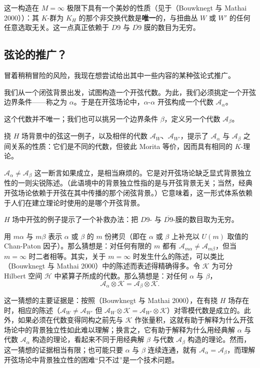 这一构造在 \(M=\infty\) 极限下具有一个美妙的性质（见于（Bouwknegt 与 Mathai 2000））：其 \(K\)-群为 \(K_H\) 的那个非交换代数是\textbf{唯一}的，与扭曲丛 \(W\) 或 \(W'\) 的任何任意选取无关。这一点真正依赖于 \(D9\) 与 \(\overline{D9}\) 膜的数目为无穷。

\subsection{弦论的推广？}

冒着稍稍冒险的风险，我现在想尝试给出其中一些内容的某种弦论式推广。

我们从一个闭弦背景出发，试图构造一个开弦代数。为此，我们必须挑定一个开弦边界条件——称之为 \(\alpha\)。于是在开弦场论中，\(\alpha\)-\(\alpha\) 开弦构成一个代数 \({\mathcal A}_\alpha\)。

这个代数并不唯一；我们也可以挑另一个边界条件 \(\beta\)，定义另一个代数 \({\mathcal A}_\beta\)。

挠 \(H\) 场背景中的弦这一例子，以及相伴的代数 \({\mathcal A}_W\)、\({\mathcal A}_{W'}\)，提示了 \({\mathcal A}_\alpha\) 与 \({\mathcal A}_\beta\) 之间关系的性质：它们是不同的代数，但彼此 Morita 等价，因而具有相同的 \(K\)-理论。

\({\mathcal A}_\alpha\not={\mathcal A}_\beta\) 这一断言如果成立，是相当麻烦的。它是对开弦场论缺乏显式背景独立性的一则尖锐陈述。（此语境中的背景独立性指的是与开弦背景无关；当然，经典开弦场论依赖于开弦在其中传播的那个闭弦背景。）它意味着，这一形式体系依赖于人们在建立理论时使用的是哪个开弦背景。

\(H\) 场中开弦的例子提示了一个补救办法：把 \(D9\)- 与 \(\overline{D9}\)-膜的数目取为无穷。

用 \(m\alpha\) 与 \(m\beta\) 表示 \(\alpha\) 或 \(\beta\) 的 \(m\) 份拷贝（即在 \(\alpha\) 或 \(\beta\) 上补充以 \(U(m)\) 取值的 Chan-Paton 因子）。那么猜想是：对任何有限的 \(m\) 都有 \({\mathcal A}_{m\alpha}\not={\mathcal A}_{m\beta}\)，但当 \(m=\infty\) 时二者相等。其实，关于 \(m=\infty\) 时发生什么的陈述，可以类比（Bouwknegt 与 Mathai 2000）中的陈述而表述得精确得多。令 \({\mathcal K}\) 为可分 Hilbert 空间 \({\mathcal H}\) 中紧算子所成的代数。那么猜想是：对任何 \(\alpha\) 与 \(\beta\)， \begin{equation}\tag{3.5}\label{eq:3.5}
{\mathcal A}_\alpha\otimes {\mathcal K}={\mathcal A}_\beta\otimes {\mathcal K}.
\end{equation}

这一猜想的主要证据是：按照（Bouwknegt 与 Mathai 2000），在有挠 \(H\) 场存在时，相应的陈述（\({\mathcal A}_W\not={\mathcal A}_{W'}\) 但 \({\mathcal A}_W\otimes{\mathcal K}={\mathcal A}_{W'}\otimes {\mathcal K}\)）对零模代数是成立的。此外，如果必须在代数变得同构之前先与 \({\mathcal K}\) 作张量积，这就有助于解释为什么开弦场论中的背景独立性如此难以理解；换言之，它有助于解释为什么用经典解 \(\alpha\) 与代数 \({\mathcal A}_\alpha\) 构造的理论，看起来不同于用经典解 \(\beta\) 与代数 \({\mathcal A}_\beta\) 构造的理论。然而，这一猜想的证据相当有限；也可能只要 \(\alpha\) 与 \(\beta\) 连续连通，就有 \({\mathcal A}_\alpha={\mathcal A}_\beta\)，而理解开弦场论中背景独立性的困难“只不过”是一个技术问题。

